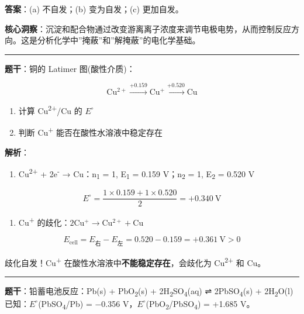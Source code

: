 \textbf{答案}：(a) 不自发；(b) 变为自发；(c) 更加自发。

\textbf{核心洞察}：沉淀和配合物通过改变游离离子浓度来调节电极电势，从而控制反应方向。这是分析化学中''掩蔽''和''解掩蔽''的电化学基础。

\begin{center}\rule{0.5\linewidth}{0.5pt}\end{center}

\textbf{题干}：铜的 Latimer 图(酸性介质)：

\[\mathrm{Cu^{2+}} \xrightarrow{+0.159} \mathrm{Cu^+} \xrightarrow{+0.520} \mathrm{Cu}\]

\begin{enumerate}
\def\labelenumi{(\alph{enumi})}
\tightlist
\item
  计算 Cu\textsuperscript{2+}/Cu 的 \(E^{\circ}\)
\item
  判断 Cu\textsuperscript{+} 能否在酸性水溶液中稳定存在
\end{enumerate}

\textbf{解析}：

\begin{enumerate}
\def\labelenumi{(\alph{enumi})}
\tightlist
\item
  Cu\textsuperscript{2+} + 2e\textsuperscript{-} → Cu：n\textsubscript{1} = 1, E\textsubscript{1} = 0.159 V；n\textsubscript{2} = 1, E\textsubscript{2} = 0.520 V
\end{enumerate}

\[E^\circ = \frac{1 \times 0.159 + 1 \times 0.520}{2} = +0.340\ \mathrm{V}\]

\begin{enumerate}
\def\labelenumi{(\alph{enumi})}
\setcounter{enumi}{1}
\tightlist
\item
  Cu\textsuperscript{+} 的歧化：\(2\mathrm{Cu^+ \to Cu^{2+} + Cu}\)
\end{enumerate}

\[E_{\text{cell}} = E_{\text{右}} - E_{\text{左}} = 0.520 - 0.159 = +0.361\ \mathrm{V} > 0\]

歧化自发！Cu\textsuperscript{+} 在酸性水溶液中\textbf{不能稳定存在}，会歧化为 Cu\textsuperscript{2+} 和 Cu。

\begin{center}\rule{0.5\linewidth}{0.5pt}\end{center}

\textbf{题干}：铅蓄电池反应：Pb(s) + PbO\textsubscript{2}(s) + 2H\textsubscript{2}SO\textsubscript{4}(aq) ⇌ 2PbSO\textsubscript{4}(s) + 2H\textsubscript{2}O(l)
已知：\(E^{\circ}\)(PbSO\textsubscript{4}/Pb) = −0.356 V，\(E^{\circ}\)(PbO\textsubscript{2}/PbSO\textsubscript{4}) = +1.685 V。

